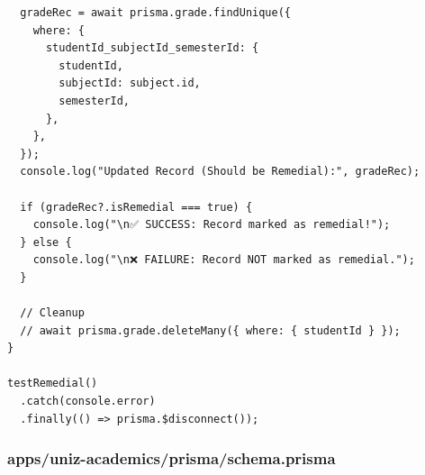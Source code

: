 \documentclass[11pt,a4paper,oneside]{article}
\begin{document}
\begin{lstlisting}
  gradeRec = await prisma.grade.findUnique({
    where: {
      studentId_subjectId_semesterId: {
        studentId,
        subjectId: subject.id,
        semesterId,
      },
    },
  });
  console.log("Updated Record (Should be Remedial):", gradeRec);

  if (gradeRec?.isRemedial === true) {
    console.log("\n✅ SUCCESS: Record marked as remedial!");
  } else {
    console.log("\n❌ FAILURE: Record NOT marked as remedial.");
  }

  // Cleanup
  // await prisma.grade.deleteMany({ where: { studentId } });
}

testRemedial()
  .catch(console.error)
  .finally(() => prisma.$disconnect());

\end{lstlisting}
\subsubsection*{apps/uniz-academics/prisma/schema.prisma}
\end{document}
